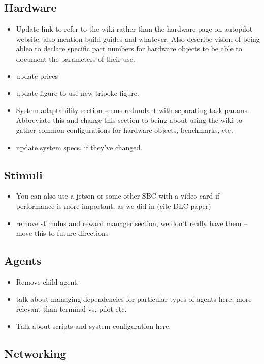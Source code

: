 \subsection{Hardware}

\begin{itemize}
\item Update link to refer to the wiki rather than the hardware page on autopilot website. also mention build guides and whatever. Also describe vision of being ableo to declare specific part numbers for hardware objects to be able to document the parameters of their use.
\item \sout{update prices}
\item update figure to use new tripoke figure.
\item System adaptability section seems redundant with separating task params. Abbreviate this and change this section to being about using the wiki to gather common configurations for hardware objects, benchmarks, etc.
\item update system specs, if they've changed.
\end{itemize}

\subsection{Stimuli}

\begin{itemize}
\item You can also use a jetson or some other SBC with a video card if performance is more important. as we did in (cite DLC paper)
\item remove stimulus and reward manager section, we don't really have them -- move this to future directions
\end{itemize}

\subsection{Agents}

\begin{itemize}
\item Remove child agent. 
\item talk about managing dependencies for particular types of agents here, more relevant than terminal vs. pilot etc.
\item Talk about scripts and system configuration here.
\end{itemize}

\subsection{Networking}

